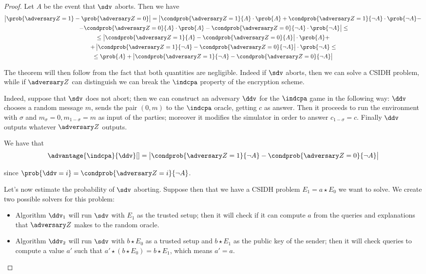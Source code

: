 \begin{proof}
    Let $A$ be the event that $\sdv$ aborts. Then we have
    \begin{multline*}
        \left|\prob{\zdv=1}-\prob{\zdv=0}\right| = \left|\condprob{\zdv=1}{A}\cdot\prob{A} + \condprob{\zdv=1}{\neg A}\cdot\prob{\neg A} -\right.\\\left.- \condprob{\zdv=0}{A}\cdot\prob{A} - \condprob{\zdv=0}{\neg A}\cdot\prob{\neg A}\right|\le\\
        \le \left| \condprob{\zdv=1}{A} - \condprob{\zdv=0}{A}\right|\cdot\prob{A}  +\\
        + \left| \condprob{\zdv=1}{\neg A} - \condprob{\zdv=0}{\neg A}\right|\cdot\prob{\neg A} \le \\
        \le \prob{A} + \left| \condprob{\zdv=1}{\neg A} - \condprob{\zdv=0}{\neg A}\right|
    \end{multline*}

    The theorem will then follow from the fact that both quantities are negligible. Indeed if $\sdv$ aborts, then we can solve a CSIDH problem, while if $\zdv$ can distinguish we can break the $\indcpa$ property of the encryption scheme.
    
    Indeed, suppose that $\sdv$ does not abort; then we can construct an adversary $\ddv$ for the $\indcpa$ game in the following way: $\ddv$ chooses a random message $m$, sends the pair $(0,m)$ to the $\indcpa$ oracle, getting $c$ as answer. Then it proceeds to run the environment with $\sigma$ and $m_\sigma=0, m_{1-\sigma}=m$ as input of the parties; moreover it modifies the simulator in order to answer $c_{1-\sigma}=c$. Finally $\ddv$ outputs whatever $\zdv$ outputs.
    
    We have that $$\advantage{\indcpa}{\ddv}[] = \left| \condprob{\zdv=1}{\neg A} - \condprob{\zdv=0}{\neg A}\right|$$
    
    since $\prob{\ddv=i}=\condprob{\zdv=i}{\neg A}$.
    
    
    Let's now estimate the probability of $\sdv$ aborting. Suppose then that we have a CSIDH problem $E_1=a\star E_0$ we want to solve. We create two possible solvers for this problem:
    \begin{itemize}
        \item Algorithm $\ddv_1$ will run $\sdv$ with $E_1$ as the trusted setup; then it will check if it can compute $a$ from the queries and explanations that $\zdv$ makes to the random oracle.
        \item Algorithm $\ddv_2$ will run $\sdv$ with $b\star E_0$ as a trusted setup and $b\star E_1$ as the public key of the sender; then it will check queries to compute a value $a'$ such that $a'\star(b\star E_0)=b\star E_1$, which means $a'=a$.
    \end{itemize}
    

\end{proof}
